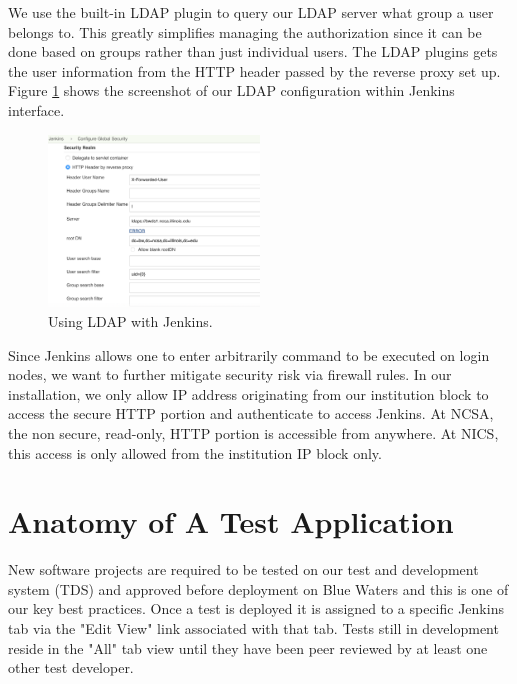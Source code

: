 \documentclass[10pt, conference, compsocconf]{IEEEtran}
\begin{document}
{We use the built-in LDAP plugin to query our LDAP server what group a user belongs to.
This greatly simplifies managing the authorization since it can be done based on groups rather than just individual users. 
The LDAP plugins gets the user information from the HTTP header passed by the reverse proxy set up. 
Figure \ref{fig:LDAP-Jenkins} shows the screenshot of our LDAP configuration within Jenkins interface.

\begin{figure}
\centering
\includegraphics[width=0.5\textwidth]{LDAP-Jenkins}
\caption{Using LDAP with Jenkins.}
\label{fig:LDAP-Jenkins}
\end{figure}

Since Jenkins allows one to enter arbitrarily command to be executed on login nodes, we want to further mitigate security risk via firewall rules. 
In our installation, we only allow IP address originating from our institution block to access the secure HTTP portion and authenticate to access Jenkins. 
At NCSA, the non secure, read-only, HTTP portion is accessible from anywhere. 
At NICS, this access is only allowed from the institution IP block only. 


\section{Anatomy of A Test Application}
\label{sec:TestAnatomy}
New software projects are required to be tested on our test and development system (TDS) and approved before deployment on Blue Waters and this is one of our key best practices. 
 Once a test is deployed it is assigned to a specific Jenkins tab via the "Edit View" link associated with that tab. 
 Tests still in development reside in the "All" tab view until they have been peer reviewed by at least one other test developer.
}
\end{document}
